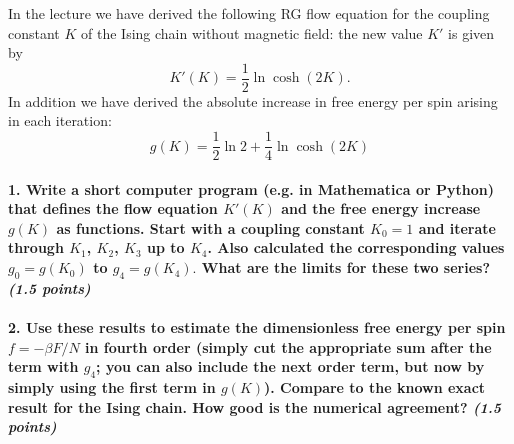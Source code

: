 In the lecture we have derived the following 
RG flow equation for the coupling constant $K$ 
of the Ising chain without magnetic field: 
the new value $K'$ is given by
\begin{equation}
    K'(K)=\frac{1}{2}\ln\cosh(2K).
\end{equation}
In addition we have derived the absolute 
increase in free energy per spin arising in 
each iteration:
\begin{equation}
    g(K)=\frac{1}{2}\ln2
    +\frac{1}{4}\ln\cosh(2K)
\end{equation}

\paragraph{1. Write a short computer program 
    (e.g. in Mathematica or Python) that 
    defines the flow equation $K'(K)$ and the 
    free energy increase $g(K)$ as functions. 
    Start with a coupling constant $K_0=1$ and 
    iterate through $K_1$, $K_2$, $K_3$ up to 
    $K_4$. Also calculated the corresponding 
    values $g_0=g(K_0)$ to $g_4=g(K_4).$ What 
    are the limits for these two series? 
    \textit{(1.5 points)}
}

\paragraph{2. Use these results to estimate 
    the dimensionless free energy per spin 
    $f=-\beta F/N$ in fourth order (simply cut 
    the appropriate sum after the term with 
    $g_4$; you can also include the next order
    term, but now by simply using the first 
    term in $g(K)$). Compare to the known 
    exact result for the Ising chain. How good
    is the numerical agreement?
    \textit{(1.5 points)}
}
